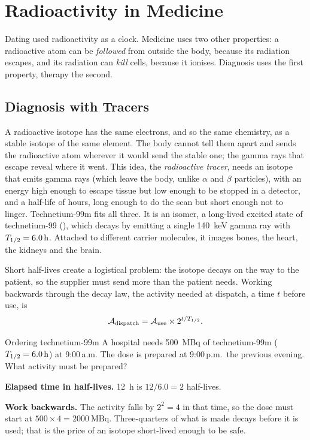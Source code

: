 \section{Radioactivity in Medicine}\label{sec:nucapp-medicine}

Dating used radioactivity as a clock. Medicine uses two other properties: a radioactive atom can be
\emph{followed} from outside the body, because its radiation escapes, and its radiation can \emph{kill}
cells, because it ionises. Diagnosis uses the first property, therapy the second.

\subsection{Diagnosis with Tracers}

A radioactive isotope has the same electrons, and so the same chemistry, as a stable isotope of the same
element. The body cannot tell them apart and sends the radioactive atom wherever it would send the stable
one; the gamma rays that escape reveal where it went. This idea, the \emph{radioactive tracer}, needs an
isotope that emits gamma rays (which leave the body, unlike $\alpha$ and $\beta$ particles), with an energy
high enough to escape tissue but low enough to be stopped in a detector, and a half-life of hours, long
enough to do the scan but short enough not to linger. Technetium-99m fits all three. It is an isomer,
a long-lived excited state of technetium-99 (), which decays by emitting a single
\SI{140}{keV} gamma ray with $T_{1/2}=\SI{6.0}{h}$. Attached to different carrier molecules, it images
bones, the heart, the kidneys and the brain.

Short half-lives create a logistical problem: the isotope decays on the way to the patient, so the
supplier must send more than the patient needs. Working backwards through the decay law, the activity
needed at dispatch, a time $t$ before use, is
\[
\mathcal{A}_\text{dispatch}=\mathcal{A}_\text{use}\times2^{t/T_{1/2}}.
\]

\begin{exbox}{Ordering technetium-99m}\label{ex:nucapp-tc99m}
A hospital needs \SI{500}{\mega\becquerel} of technetium-99m ($T_{1/2}=\SI{6.0}{h}$) at 9:00\,a.m. The
dose is prepared at 9:00\,p.m.\ the previous evening. What activity must be prepared?

 \textbf{Elapsed time in half-lives.} \SI{12}{h} is $12/6.0=2$ half-lives.

 \textbf{Work backwards.} The activity falls by $2^2=4$ in that time, so the dose must start at
$500\times4=\SI{2000}{\mega\becquerel}$. Three-quarters of what is made decays before it is used; that is
the price of an isotope short-lived enough to be safe.
\end{exbox}

